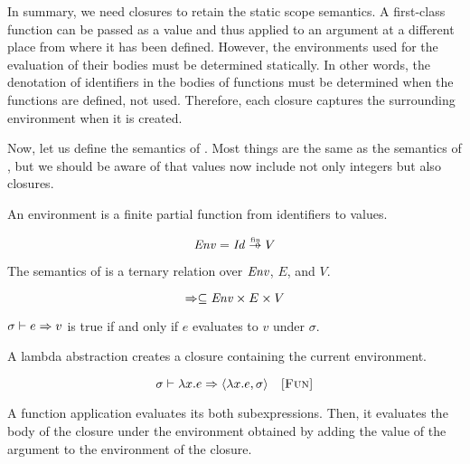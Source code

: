 In summary, we need closures to retain the static scope semantics. A first-class
function can be passed as a value and thus applied to an argument at a different
place from where it has been defined. However, the environments used for the
evaluation of their bodies must be determined statically. In other words,
the denotation of identifiers in the bodies of functions must be determined when
the functions are defined, not used. Therefore, each closure captures the surrounding
environment when it is created.

Now, let us define the semantics of \lang. Most things are the same as the
semantics of \plang, but we should be aware of that values now include not only
integers but also closures.

An environment is a finite partial function from identifiers to values.

\[ \embox{Env}=\embox{Id}\finto V \]

The semantics of \lang is a ternary relation over $\mbox{\emph{Env}}$, $E$, and $V$.

\[\Rightarrow\subseteq\mbox{\emph{Env}}\times E\times V\]

$\sigma\vdash e\Rightarrow v$ is true if and only if $e$ evaluates to $v$ under $\sigma$.

A lambda abstraction creates a closure containing the current environment.


\vspace{-1em}

\[
  \sigma\vdash\lambda x.e\Rightarrow\langle\lambda x.e,\sigma\rangle
  \quad\textsc{[Fun]}
\]

A function application evaluates its both subexpressions. Then, it evaluates the
body of the closure under the environment obtained by adding the value of the
argument to the environment of the closure.


\vspace{-1em}

